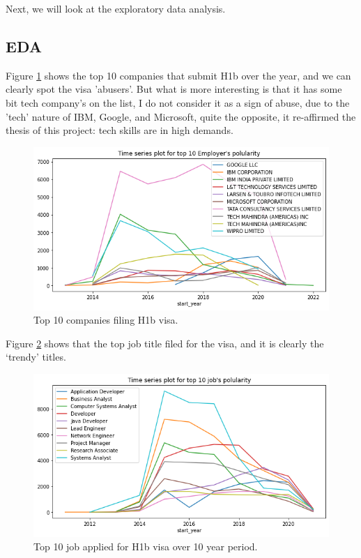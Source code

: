 Next, we will look at the exploratory data analysis.  
\subsection{EDA}
Figure \ref{top10comp} shows the top 10 companies that submit H1b over the year, and we can clearly spot the visa 'abusers'. But what is more interesting is that it has some bit tech company's on the list, I do not consider it as a sign of abuse, due to the 'tech' nature of IBM, Google, and Microsoft, quite the opposite, it re-affirmed  the thesis of this project: tech skills are in high demands. \\
\begin{figure}[h!]
	\begin{center}
		\includegraphics[width=\linewidth]{./photos/top10employers_timeseries.png}
	\end{center}
	\caption{Top 10 companies filing H1b visa.}
	\label{top10comp}
\end{figure}
Figure \ref{top10job} shows that the  top job title filed for the visa, and it is clearly the `trendy' titles.  \\
\begin{figure}[h!]
	\begin{center}
		\includegraphics[width=\linewidth]{./photos/top10job_timeseries.png}
	\end{center}
	\caption{Top 10 job applied for H1b visa over 10 year period.}
	\label{top10job}
\end{figure}
